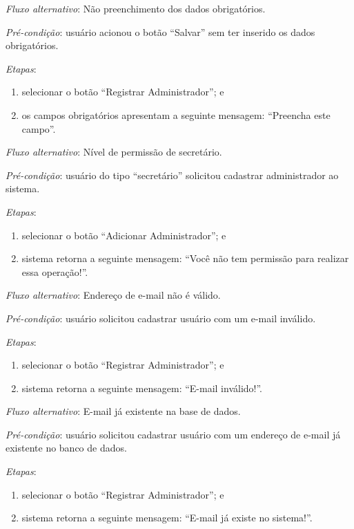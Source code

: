 \documentclass[a4paper,12pt]{article}
\begin{document}
\noindent \textit{Fluxo alternativo}: Não preenchimento dos dados obrigatórios.

\noindent \textit{Pré-condição}: usuário acionou o botão ``Salvar'' sem ter inserido os dados obrigatórios.

\noindent \textit{Etapas}:

\begin{enumerate}
    \item selecionar o botão ``Registrar Administrador''; e
    \item os campos obrigatórios apresentam a seguinte mensagem: ``Preencha este campo''.
\end{enumerate}


\noindent \textit{Fluxo alternativo}: Nível de permissão de secretário.

\noindent \textit{Pré-condição}: usuário do tipo ``secretário'' solicitou cadastrar administrador ao sistema.

\noindent \textit{Etapas}:

\begin{enumerate}
    \item selecionar o botão ``Adicionar Administrador''; e
    \item sistema retorna a seguinte mensagem: ``Você não tem permissão para realizar essa operação!''.
\end{enumerate}


\noindent \textit{Fluxo alternativo}: Endereço de e-mail não é válido.

\noindent \textit{Pré-condição}: usuário solicitou cadastrar usuário com um e-mail inválido.

\noindent \textit{Etapas}:

\begin{enumerate}
    \item selecionar o botão ``Registrar Administrador''; e
    \item sistema retorna a seguinte mensagem: ``E-mail inválido!''.
\end{enumerate}


\noindent \textit{Fluxo alternativo}: E-mail já existente na base de dados.

\noindent \textit{Pré-condição}: usuário solicitou cadastrar usuário com um endereço de e-mail já existente no banco de dados.

\noindent \textit{Etapas}:

\begin{enumerate}
    \item selecionar o botão ``Registrar Administrador''; e
    \item sistema retorna a seguinte mensagem: ``E-mail já existe no sistema!''.
\end{enumerate}
\end{document}
